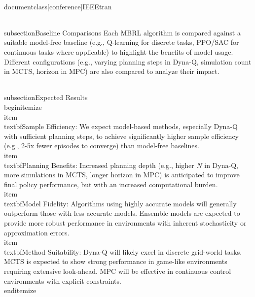 \\documentclass[conference]{IEEEtran}
\begin{document}
\\subsection{Baseline Comparisons}
Each MBRL algorithm is compared against a suitable model-free baseline (e.g., Q-learning for discrete tasks, PPO/SAC for continuous tasks where applicable) to highlight the benefits of model usage. Different configurations (e.g., varying planning steps in Dyna-Q, simulation count in MCTS, horizon in MPC) are also compared to analyze their impact.

\\subsection{Expected Results}
\\begin{itemize}
    \\item \\textbf{Sample Efficiency}: We expect model-based methods, especially Dyna-Q with sufficient planning steps, to achieve significantly higher sample efficiency (e.g., 2-5x fewer episodes to converge) than model-free baselines.
    \\item \\textbf{Planning Benefits}: Increased planning depth (e.g., higher $N$ in Dyna-Q, more simulations in MCTS, longer horizon in MPC) is anticipated to improve final policy performance, but with an increased computational burden.
    \\item \\textbf{Model Fidelity}: Algorithms using highly accurate models will generally outperform those with less accurate models. Ensemble models are expected to provide more robust performance in environments with inherent stochasticity or approximation errors.
    \\item \\textbf{Method Suitability}: Dyna-Q will likely excel in discrete grid-world tasks. MCTS is expected to show strong performance in game-like environments requiring extensive look-ahead. MPC will be effective in continuous control environments with explicit constraints.
\\end{itemize}
\end{document}
